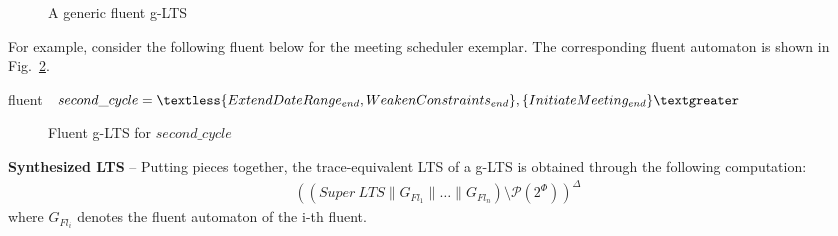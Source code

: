 \begin{figure}[H]\centering
{}
\caption{A generic fluent g-LTS\label{image:fluent-glts}}
\end{figure}

For example, consider the following fluent below for the meeting scheduler exemplar. The corresponding fluent automaton is shown in Fig.~\ref{image:second-cycle-fluent-glts}.
\begin{center}
fluent $second\_cycle = \textless \{ ExtendDateRange_{end}, \newline WeakenConstraints_{end} \},
 \{ InitiateMeeting_{end} \} \textgreater $\\
\end{center}

\begin{figure}[H]\centering
{}
\caption{Fluent g-LTS for $second\_cycle$\label{image:second-cycle-fluent-glts}}
\end{figure}

\noindent \textbf{Synthesized LTS} -- Putting pieces together, the trace-equivalent LTS of a g-LTS is obtained through the following computation:
\begin{align*}
\left((Super~LTS \parallel G_{Fl_1} \parallel \ldots \parallel G_{Fl_n}) \setminus \mathcal{P}(2^\Phi)\right)^\Delta
\end{align*}
\noindent where $G_{Fl_i}$ denotes the fluent automaton of the i-th fluent.

